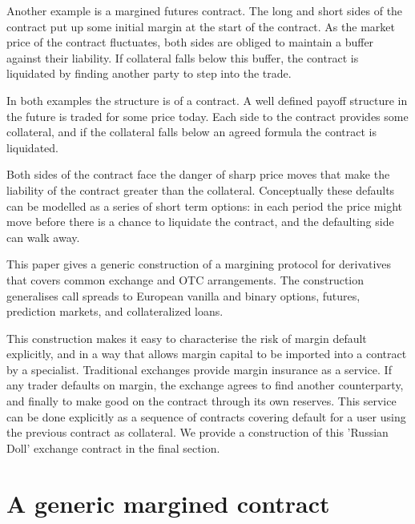 \documentclass[12pt]{article}
\begin{document}
Another example is a margined futures contract. The long and short sides of the contract put up some initial margin at the start of the contract. As the market price of the contract fluctuates, both sides are obliged to maintain a buffer against their liability. If collateral falls below this buffer, the contract is liquidated by finding another party to step into the trade. 

In both examples the structure is of a contract. A well defined payoff structure in the future is traded for some price today. Each side to the contract provides some collateral, and if the collateral falls below an agreed formula the contract is liquidated.

Both sides of the contract face the danger of sharp price moves that make the liability of the contract greater than the collateral. Conceptually these defaults can be modelled as a series of short term options: in each period the price might move before there is a chance to liquidate the contract, and the defaulting side can walk away. 

This paper gives a generic construction of a margining protocol for derivatives that covers common exchange and OTC arrangements. The construction generalises call spreads to European vanilla and binary options, futures, prediction markets, and collateralized loans. 


This construction makes it easy to characterise the risk of margin default explicitly, and in a way that allows margin capital to be imported into a contract by a specialist. Traditional exchanges provide margin insurance as a service. If any trader defaults on margin, the exchange agrees to find another counterparty, and finally to make good on the contract through its own reserves.  This service can be done explicitly as a sequence of contracts covering default for a user using the previous contract as collateral. We provide a construction of this 'Russian Doll' exchange contract in the final section.


\section{A generic margined contract } \label{genericcontracts}
\end{document}
